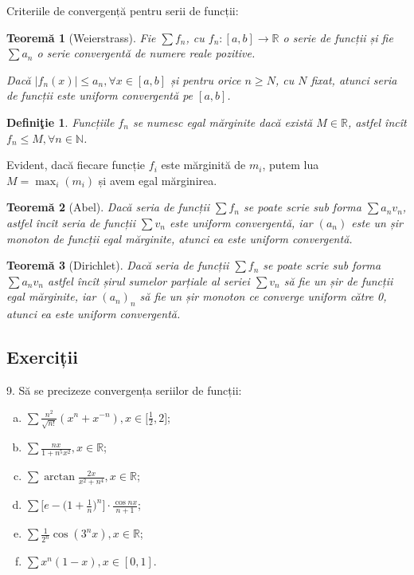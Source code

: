 \documentclass[11pt,a4paper]{article}
\newcommand\NN{\mathbb{N}}
\newcommand\RR{\mathbb{R}}
\theoremstyle{dotless}
\newtheorem{theorem}{Teorem\u{a}}[section]
\theoremstyle{dotlessdr}
\newtheorem{definition}{Defini\c{t}ie}[section]
\begin{document}
Criteriile de convergență pentru serii de funcții:

\begin{theorem}[Weierstrass]\label{thm:wei-s-f}
  Fie $\sum f_n$, cu $f_n : [a, b] \to \RR$ o serie de funcții și fie $\sum a_n$ o serie
  convergentă de numere reale pozitive.

  Dacă $|f_n(x)| \leq a_n, \forall x \in [a, b]$ și pentru orice $n \geq N$, cu $N$ fixat,
  atunci seria de funcții este uniform convergentă pe $[a, b]$.
\end{theorem}

\begin{definition}\label{def:egal-m}
  Funcțiile $f_n$ se numesc \emph{egal mărginite} dacă există $M \in \RR$, astfel
  încît $f_n \leq M, \forall n \in \NN$.
\end{definition}

Evident, dacă fiecare funcție $f_i$ este mărginită de $m_i$, putem lua
$M = \max_i (m_i)$ și avem egal mărginirea.

\begin{theorem}[Abel]\label{thm:abel-s-f}
  Dacă seria de funcții $\sum f_n$ se poate scrie sub forma $\sum a_n v_n$, astfel
  încît seria de funcții $\sum v_n$ este uniform convergentă, iar $(a_n)$ este
  un șir monoton de funcții egal mărginite, atunci ea este uniform convergentă.
\end{theorem}

\begin{theorem}[Dirichlet]\label{thm:diri-s-f}
  Dacă seria de funcții $\sum f_n$ se poate scrie sub forma $\sum a_n v_n$
  astfel încît șirul sumelor parțiale al seriei $\sum v_n$ să fie un șir de funcții
  egal mărginite, iar $(a_n)_n$ să fie un șir monoton ce converge uniform către 0,
  atunci ea este uniform convergentă.
\end{theorem}


\subsection{Exerciții}
\label{subsec:exc-s-f}

9. Să se precizeze convergența seriilor de funcții:
\begin{enumerate}[(a)]
\item $\sum \frac{n^2}{\sqrt{n!}} (x^n + x^{-n}), x \in \Big[\frac{1}{2}, 2\Big]$;
\item $\sum \frac{nx}{1 + n^5 x^2}, x \in \RR$;
\item $\sum \arctan \frac{2x}{x^2 + n^4}, x \in \RR$;
\item $\sum \Big[ e - \Big( 1 + \frac{1}{n} \Big)^n \Big] \cdot \frac{\cos nx}{n + 1}$;
\item $\sum \frac{1}{2^n} \cos (3^n x), x \in \RR$;
\item $\sum x^n(1 - x), x \in [0, 1]$.
\end{enumerate}
\end{document}
